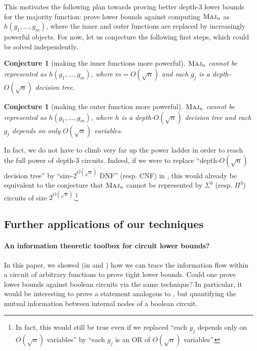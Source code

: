 \documentclass[10pt,a4paper]{article}
\newtheorem{conjecture}[lemma]{Conjecture}
\theoremstyle{definition}
\theoremstyle{remark}
\newcommand{\mathsc}[1]{{\normalfont\textsc{#1}}}
\DeclareMathOperator{\Maj}{\mathsc{Maj}}
\begin{document}
This motivates the following plan towards proving better depth-3 lower bounds for the majority function:
prove lower bounds against computing $\Maj_n$ as $h(g_1, \ldots, g_m)$, where the inner and outer functions are replaced by increasingly powerful objects.
For now, let us conjecture the following first steps, which could be solved independently.

\begin{conjecture}[making the inner functions more powerful]
\label{conj:inner-power}
$\Maj_n$ cannot be represented as $h(g_1, \ldots, g_m)$, where $m = O(\sqrt{n})$ and each $g_j$ is a depth-$O(\sqrt{n})$ decision tree.
\end{conjecture}

\begin{conjecture}[making the outer function more powerful]
\label{conj:outer-power}
$\Maj_n$ cannot be represented as $h(g_1, \ldots, g_m)$, where $h$ is a depth-$O(\sqrt{n})$ decision tree and each $g_j$ depends on only $O(\sqrt{n})$ variables.
\end{conjecture}

In fact, we do not have to climb very far up the power ladder in order to reach the full power of depth-3 circuits.
Indeed, if we were to replace ``depth-$O(\sqrt{n})$ decision tree'' by ``size-$2^{O(\sqrt{n})}$ DNF'' (resp. CNF) in , this would already be equivalent to the conjecture that $\Maj_n$ cannot be represented by $\Sigma^3$ (resp. $\Pi^3$) circuits of size $2^{O(\sqrt{n})}$.\footnote{In fact, this would still be true even if we replaced ``each $g_j$ depends only on $O(\sqrt{n})$ variables'' by ``each $g_j$ is an OR of $O(\sqrt{n})$ variables''.}

\subsection{Further applications of our techniques}

\paragraph*{An information theoretic toolbox for circuit lower bounds?} In this paper, we showed (in  and ) how we can trace the information flow within a circuit of arbitrary functions to prove tight lower bounds. Could one prove lower bounds against boolean circuits via the same technique? In particular, it would be interesting to prove a statement analogous to , but quantifying the mutual information between internal nodes of a boolean circuit. 
\end{document}
